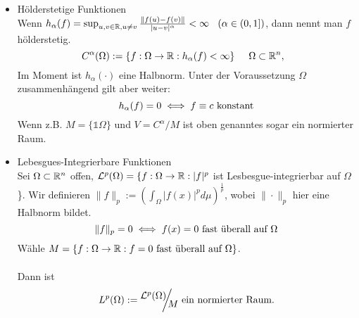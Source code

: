 \begin{beispiel}
\begin{itemize}
	\item Hölderstetige Funktionen  \\
	Wenn $h_{\alpha}(f) = \sup_{u,v \in \mathbb{R}, u \neq v} \frac{\| f(u) - f(v)\|}{|u - v|^{\alpha}} < \infty \hspace{0.25cm} \left( \alpha \in (0, 1] \right)$, dann nennt man $f$ hölderstetig.
	\[ C^{\alpha}(\Omega) := \{ f: \Omega \rightarrow \mathbb{R}: h_{\alpha}(f) < \infty \} \hspace{0.5cm} \Omega \subset \mathbb{R}^{n}, \hspace{0.25cm} \]
	Im Moment ist $h_{\alpha}( \cdot )$ eine Halbnorm. Unter der Voraussetzung $\Omega$ zusammenhängend gilt aber weiter:
	\[ h_{\alpha}(f) = 0 \iff f \equiv c \text{ konstant} \]
	Wenn z.B. $M = \{ \mathds{1} \Omega \}$ und $V = C^{\alpha}/M$ ist oben genanntes sogar ein normierter Raum.
	\item Lebesgues-Integrierbare Funktionen  \\
	Sei $\Omega \subset \mathbb{R}^{n}$ offen, $\mathcal{L}^{p}(\Omega) = \{ f: \Omega \rightarrow \mathbb{R} : |f|^{p}$ ist Lesbesgue-integrierbar auf $\Omega$  \}.
	Wir definieren $\| f \|_{p} := \left( \int_{\Omega} |f(x)|^{p} d\mu \right)^{\frac{1}{p}}$, wobei $\| \cdot \|_{p}$ hier eine Halbnorm bildet.
	\[ \| f \|_{p} = 0 \iff  f(x) = 0 \text{ fast überall auf } \Omega \]
	Wähle $M = \{ f: \Omega \rightarrow \mathbb{R}: f = 0 \text{ fast überall auf } \Omega \}$. \\ \\
	Dann ist 
	\[ L^{p}(\Omega) := \QR{ \mathcal{L}^{p}(\Omega) }{ M } \text{ ein normierter Raum.} \]
\end{itemize}
\end{beispiel}

\newpage
































